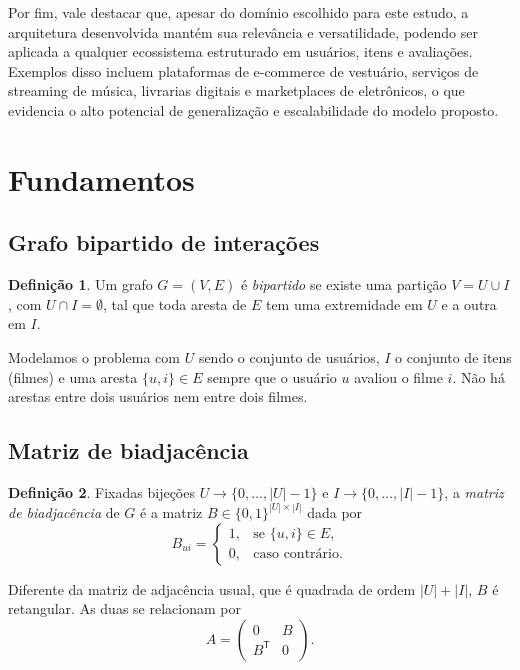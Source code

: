 \documentclass[12pt,a4paper]{article}
\theoremstyle{definition}
\newtheorem{definicao}{Definição}
\begin{document}
Por fim, vale destacar que, apesar do domínio escolhido para este estudo, a arquitetura desenvolvida mantém sua relevância e versatilidade, podendo ser aplicada a qualquer ecossistema estruturado em usuários, itens e avaliações. Exemplos disso incluem plataformas de e-commerce de vestuário, serviços de streaming de música, livrarias digitais e marketplaces de eletrônicos, o que evidencia o alto potencial de generalização e escalabilidade do modelo proposto.


\section{Fundamentos}\label{sec:fundamentos}

\subsection{Grafo bipartido de interações}

\begin{definicao}
Um grafo $G = (V, E)$ é \emph{bipartido} se existe uma partição
$V = U \cup I$, com $U \cap I = \emptyset$, tal que toda aresta de $E$ tem
uma extremidade em $U$ e a outra em $I$.
\end{definicao}

Modelamos o problema com $U$ sendo o conjunto de usuários, $I$ o conjunto de
itens (filmes) e uma aresta $\{u, i\} \in E$ sempre que o usuário $u$ avaliou
o filme $i$. Não há arestas entre dois usuários nem entre dois filmes.

\subsection{Matriz de biadjacência}

\begin{definicao}
Fixadas bijeções $U \to \{0, \dots, |U|-1\}$ e $I \to \{0, \dots, |I|-1\}$, a
\emph{matriz de biadjacência} de $G$ é a matriz $B \in \{0,1\}^{|U| \times |I|}$
dada por
\[
  B_{ui} =
  \begin{cases}
    1, & \text{se } \{u, i\} \in E,\\
    0, & \text{caso contrário.}
  \end{cases}
\]
\end{definicao}

Diferente da matriz de adjacência usual, que é quadrada de ordem $|U|+|I|$,
$B$ é retangular. As duas se relacionam por
\[
  A = \begin{pmatrix} 0 & B \\ B^{\mathsf T} & 0 \end{pmatrix}.
\]
\end{document}
